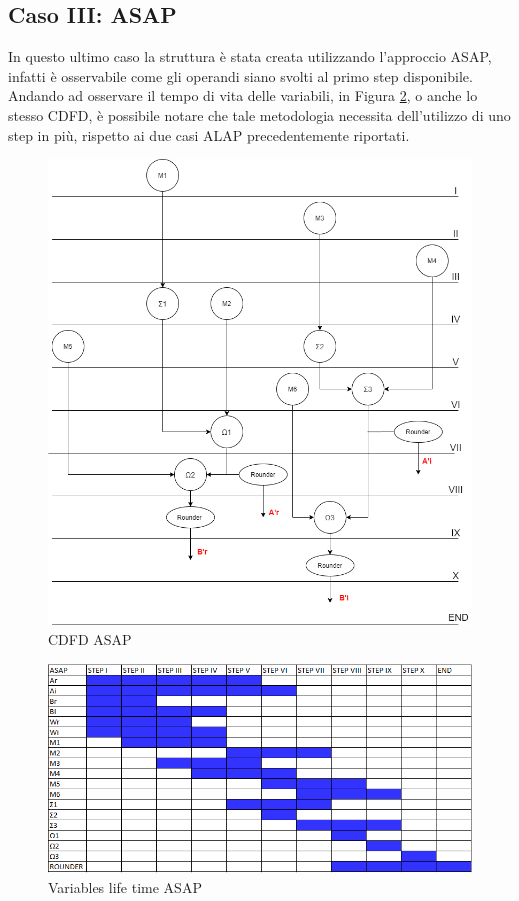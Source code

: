 \documentclass[a4paper, titlepage]{article}
\begin{document}
\subsection{Caso III: ASAP} %
In questo ultimo caso la struttura è stata creata utilizzando l'approccio ASAP, infatti è osservabile come gli operandi siano svolti al primo step disponibile.\\Andando ad osservare il tempo di vita delle variabili, in Figura \ref{fig:tempo di vita delle variabili ASAP}, o anche lo stesso CDFD, è possibile notare che tale metodologia necessita dell'utilizzo di uno step in più, rispetto ai due casi ALAP precedentemente riportati.
\begin{figure}[!h]
\centering
\includegraphics[scale=0.4]{DFD_ASAP.png}
\caption{CDFD ASAP}
\label{fig:ASAP}
\end{figure}
\begin{figure}[!h]
\centering
\includegraphics[scale=0.6]{Variables life time ASAP}
\caption{Variables life time ASAP}
\label{fig:tempo di vita delle variabili ASAP}
\end{figure}\\\\\\\\
\end{document}
